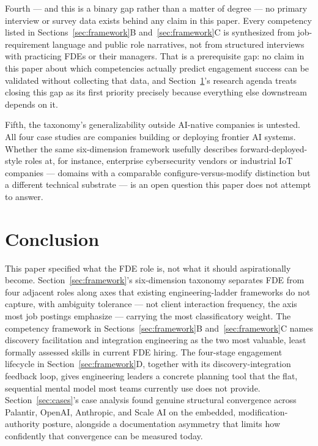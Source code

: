 \documentclass[journal]{IEEEtran}
\begin{document}
Fourth --- and this is a binary gap rather than a matter of degree --- no primary interview or survey data exists behind any claim in this paper. Every competency listed in Sections~\ref{sec:framework}B and~\ref{sec:framework}C is synthesized from job-requirement language and public role narratives, not from structured interviews with practicing FDEs or their managers. That is a prerequisite gap: no claim in this paper about which competencies actually predict engagement success can be validated without collecting that data, and Section~\ref{sec:conclusion}'s research agenda treats closing this gap as its first priority precisely because everything else downstream depends on it.

Fifth, the taxonomy's generalizability outside AI-native companies is untested. All four case studies are companies building or deploying frontier AI systems. Whether the same six-dimension framework usefully describes forward-deployed-style roles at, for instance, enterprise cybersecurity vendors or industrial IoT companies --- domains with a comparable configure-versus-modify distinction but a different technical substrate --- is an open question this paper does not attempt to answer.

\section{Conclusion}
\label{sec:conclusion}

This paper specified what the FDE role is, not what it should aspirationally become. Section~\ref{sec:framework}'s six-dimension taxonomy separates FDE from four adjacent roles along axes that existing engineering-ladder frameworks do not capture, with ambiguity tolerance --- not client interaction frequency, the axis most job postings emphasize --- carrying the most classificatory weight. The competency framework in Sections~\ref{sec:framework}B and~\ref{sec:framework}C names discovery facilitation and integration engineering as the two most valuable, least formally assessed skills in current FDE hiring. The four-stage engagement lifecycle in Section~\ref{sec:framework}D, together with its discovery-integration feedback loop, gives engineering leaders a concrete planning tool that the flat, sequential mental model most teams currently use does not provide. Section~\ref{sec:cases}'s case analysis found genuine structural convergence across Palantir, OpenAI, Anthropic, and Scale AI on the embedded, modification-authority posture, alongside a documentation asymmetry that limits how confidently that convergence can be measured today.
\end{document}
